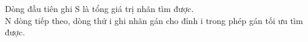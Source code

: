 Dòng đầu tiên ghi S là tổng giá trị nhãn tìm được.
\\N dòng tiếp theo, dòng thứ i ghi nhãn gán cho đỉnh i trong phép gán tối ưu tìm được.